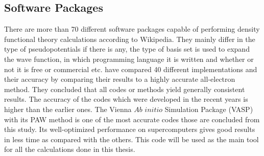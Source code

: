\subsection{Software Packages}
There are more than 70 different software packages capable of performing density functional theory calculations according to Wikipedia\cite{dft_sws}. They mainly differ in the type of pseudopotentials if there is any, the type of basis set is used to expand the wave function, in which programming language it is written and whether or not it is free or commercial etc. \citet{Lejaeghereaad3000} have compared 40 different implementations and their accuracy by comparing their results to a highly accurate all-electron method. They concluded that all codes or methods yield generally consistent results. The accuracy of the codes which were developed in the recent years is higher than the earlier ones. The Vienna $Ab$ $initio$ Simulation Package (VASP) \cite{VASP1,VASP2} with its PAW method is one of the most accurate codes those are concluded from this study. Its well-optimized performance on supercomputers gives good results in less time as compared with the others. This code will be used as the main tool for all the calculations done in this thesis.